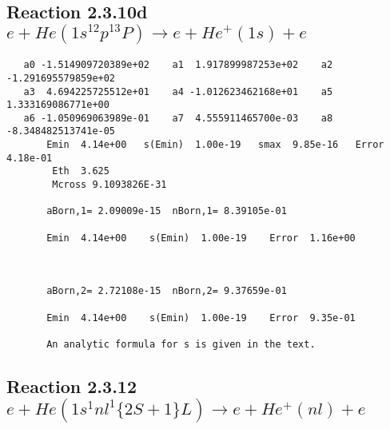 \documentclass[12pt,dvipdfmx]{article}
\begin{document}
\newpage
\subsection{
Reaction 2.3.10d $e + He(1s^12p^13P) \rightarrow e + He^+(1s) + e$}














\begin{small}\begin{verbatim}
   a0 -1.514909720389e+02    a1  1.917899987253e+02    a2 -1.291695579859e+02
   a3  4.694225725512e+01    a4 -1.012623462168e+01    a5  1.333169086771e+00
   a6 -1.050969063989e-01    a7  4.555911465700e-03    a8 -8.348482513741e-05
       Emin  4.14e+00   s(Emin)  1.00e-19   smax  9.85e-16   Error  4.18e-01
        Eth  3.625
        Mcross 9.1093826E-31

       aBorn,1= 2.09009e-15  nBorn,1= 8.39105e-01

       Emin  4.14e+00    s(Emin)  1.00e-19    Error  1.16e+00



       aBorn,2= 2.72108e-15  nBorn,2= 9.37659e-01

       Emin  4.14e+00    s(Emin)  1.00e-19    Error  9.35e-01

       An analytic formula for s is given in the text.
\end{verbatim}\end{small}









\newpage
\subsection{
Reaction 2.3.12 $e + He(1s^1nl^1  \{2S+1\}L) \rightarrow e + He^+(nl)+e$}






\end{document}
